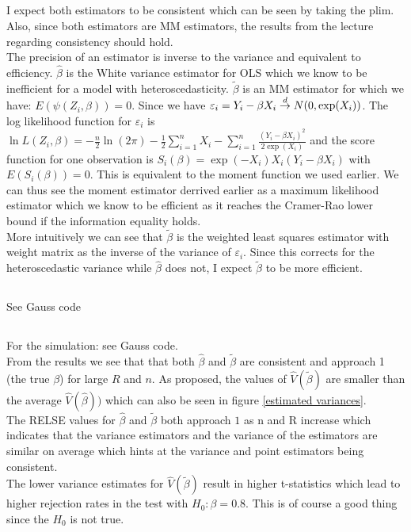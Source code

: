 \documentclass[11pt]{article}
\theoremstyle{break}
\begin{document}
\subsection{}
I expect both estimators to be consistent which can be seen by taking the plim. Also, since both estimators are MM estimators, the results from the lecture regarding consistency should hold. \\
The precision of an estimator is inverse to the variance and equivalent to efficiency. $\hat{\beta}$ is the White variance estimator for OLS which we know to be inefficient for a model with heteroscedasticity. $\tilde{\beta}$ is an MM estimator for which we have: $E(\psi(Z_i, \beta)) = 0$. Since we have $\varepsilon_i = Y_i - \beta X_i \;{\buildrel d \over \rightarrow}\; N(0, \exp(X_i))$. The log likelihood function for $\varepsilon_i$ is $\ln L(Z_i, \beta) = -\frac{n}{2}\ln(2\pi) - \frac{1}{2}\displaystyle\sum_{i=1}^n X_i - \displaystyle \sum_{i=1}^n \frac{(Y_i - \beta X_i)^2}{2\exp(X_i)}$ and the score function for one observation is $S_i(\beta) = \exp(-X_i)X_i(Y_i-\beta X_i)$ with $E(S_i(\beta)) = 0$. This is equivalent to the moment function we used earlier. We can thus see the moment estimator derrived earlier as a maximum likelihood estimator which we know to be efficient as it reaches the Cramer-Rao lower bound if the information equality holds. \\
More intuitively we can see that $\tilde{\beta}$ is the weighted least squares estimator with weight matrix as the inverse of the variance of $\varepsilon_i$. Since this corrects for the heteroscedastic variance while $\hat{\beta}$ does not, I expect $\tilde{\beta}$ to be more efficient.

\subsection{}
See Gauss code

\subsection{}
For the simulation: see Gauss code. \\
From the results we see that that both $\hat{\beta}$ and $\tilde{\beta}$ are consistent and approach 1 (the true $\beta$) for large $R$ and $n$. As proposed, the values of $\hat{V}(\tilde{\beta})$ are smaller than the average $\hat{V}(\hat{\beta}))$ which can also be seen in figure \ref{estimated variances}. \\
The RELSE values for $\hat{\beta}$ and $\tilde{\beta}$ both approach $1$ as n and R increase which indicates that the variance estimators and the variance of the estimators are similar on average which hints at the variance and point estimators being consistent. \\
The lower variance estimates for $\hat{V}(\tilde{\beta})$ result in higher t-statistics which lead to higher rejection rates in the test with $H_0:\beta=0.8$. This is of course a good thing since the $H_0$ is not true. \\
\end{document}
